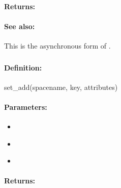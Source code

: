\paragraph{Returns:}


\paragraph{See also:}  This is the asynchronous form of .

\pagebreak
\subsubsection{}
\label{api:ruby:set_add}


\paragraph{Definition:}
\begin{rubycode}
set_add(spacename, key, attributes)
\end{rubycode}

\paragraph{Parameters:}
\begin{itemize}[noitemsep]
\item {}\\

\item {}\\

\item {}\\

\end{itemize}

\paragraph{Returns:}


\pagebreak
\subsubsection{}
\label{api:ruby:async_set_add}


